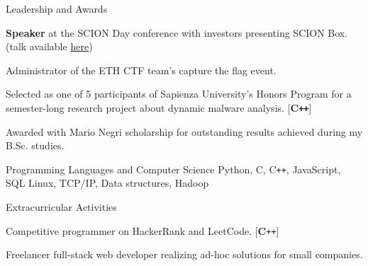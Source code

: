 \documentclass{resume}
\begin{document}
\begin{rSection}{Leadership and Awards}

\begin{rSubsection}{}{}{}{}
\item \textbf{Speaker} at the SCION Day conference with investors presenting SCION Box. (talk available \href{https://video.ethz.ch/events/2019/scion/61dd8a87-3894-489d-99d3-77ca66c5ad38.html}{here})
\item Administrator of the ETH CTF team's capture the flag event.
\item Selected as one of 5 participants of Sapienza University's Honors Program for a semester-long research project about dynamic malware analysis. [\textbf{C\texttt{++}}]
\item Awarded with Mario Negri scholarship for outstanding results achieved during my B.Sc. studies.
\end{rSubsection}

\end{rSection}


\begin{rSection}{Programming Languages and Computer Science}
Python, C, C\texttt{++}, JavaScript, SQL \hfill Linux, TCP/IP, Data structures, Hadoop
\end{rSection}


\begin{rSection}{Extracurricular Activities}

\begin{rSubsection}{}{}{}{}
\item Competitive programmer on HackerRank and LeetCode. [\textbf{C}\texttt{++}]
\item Freelancer full-stack web developer realizing ad-hoc solutions for small companies.
\end{rSubsection}
\end{rSection}
\end{document}
